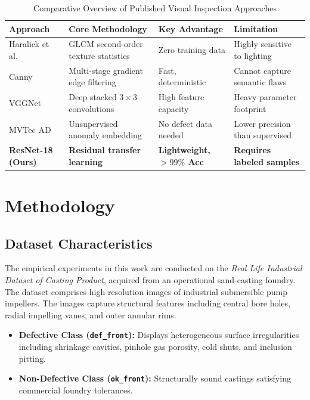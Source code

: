\documentclass[12pt,a4paper]{report}
\begin{document}
\begin{table}[t]
\centering
\caption{Comparative Overview of Published Visual Inspection Approaches}
\label{tab:lit_comparison}
\small
\begin{tabularx}{\textwidth}{lXll}
\toprule
\textbf{Approach} & \textbf{Core Methodology} & \textbf{Key Advantage} & \textbf{Limitation} \\
\midrule
Haralick et al. \cite{haralick1973textural} & GLCM second-order texture statistics & Zero training data & Highly sensitive to lighting \\
Canny \cite{canny1986computational} & Multi-stage gradient edge filtering & Fast, deterministic & Cannot capture semantic flaws \\
VGGNet \cite{simonyan2015very} & Deep stacked $3 \times 3$ convolutions & High feature capacity & Heavy parameter footprint \\
MVTec AD \cite{bergmann2019mvtec} & Unsupervised anomaly embedding & No defect data needed & Lower precision than supervised \\
\textbf{ResNet-18 (Ours)} & \textbf{Residual transfer learning} & \textbf{Lightweight, $>99\%$ Acc} & \textbf{Requires labeled samples} \\
\bottomrule
\end{tabularx}
\end{table}

\chapter{Methodology}

\section{Dataset Characteristics}
The empirical experiments in this work are conducted on the \textit{Real Life Industrial Dataset of Casting Product}, acquired from an operational sand-casting foundry. The dataset comprises high-resolution images of industrial submersible pump impellers. The images capture structural features including central bore holes, radial impelling vanes, and outer annular rims.
\begin{itemize}
    \item \textbf{Defective Class (\texttt{def\_front}):} Displays heterogeneous surface irregularities including shrinkage cavities, pinhole gas porosity, cold shuts, and inclusion pitting.
    \item \textbf{Non-Defective Class (\texttt{ok\_front}):} Structurally sound castings satisfying commercial foundry tolerances.
\end{itemize}
\end{document}
